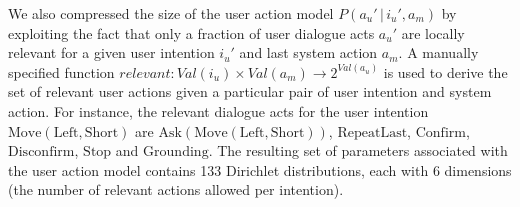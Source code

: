 
We also compressed the size of the user action model $P(a_u'\, | \, i_u', a_m)$ by exploiting the fact that only a fraction of user dialogue acts $a_u'$ are locally relevant for a given user intention $i_u'$ and last system action $a_m$.  A manually specified function $relevant: Val(i_u) \times Val(a_m) \rightarrow 2^{Val(a_u)}$ is used to derive the set of relevant user actions given a particular pair of user intention and system action. For instance, the relevant dialogue acts for the user intention $\mathrm{Move(Left,Short)}$ are $\mathrm{Ask(Move(Left,Short))}$, $\mathrm{RepeatLast}$, $\mathrm{Confirm}$, $\mathrm{Disconfirm}$, $\mathrm{Stop}$ and $\mathrm{Grounding}$. The resulting set of parameters associated with the user action model contains 133 Dirichlet distributions, each with 6 dimensions (the number of relevant actions allowed per intention). 

